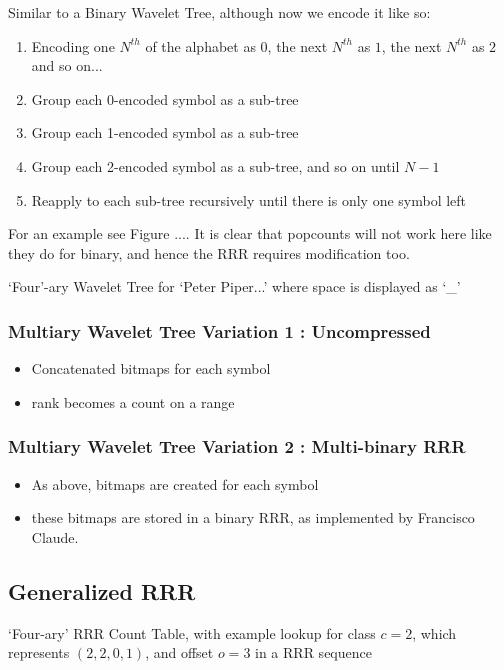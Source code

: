 Similar to a Binary Wavelet Tree, although now we encode it like so:

\begin{enumerate}
    \item Encoding one $N^{th}$ of the alphabet as $0$, the next $N^{th}$ as $1$,
    the next $N^{th}$ as $2$ and so on...
    \item Group each 0-encoded symbol as a sub-tree
    \item Group each 1-encoded symbol as a sub-tree
    \item Group each 2-encoded symbol as a sub-tree, and so on until $N-1$
    \item Reapply to each sub-tree recursively until there is only one symbol
    left
\end{enumerate}
For an example see Figure .... It is clear that popcounts will not work
here like they do for binary, and hence the RRR requires modification too.
		
			{`Four'-ary Wavelet Tree for `Peter Piper...' where space is 
			displayed as `\_'}
			

\subsubsection{Multiary Wavelet Tree Variation 1 : Uncompressed}
\begin{itemize}
\item
  Concatenated bitmaps for each symbol
\item
  rank becomes a count on a range
\end{itemize}

\subsubsection{Multiary Wavelet Tree Variation 2 : Multi-binary RRR}
\begin{itemize}
\item
  As above, bitmaps are created for each symbol
\item
  these bitmaps are stored in a binary RRR, as implemented by
  Francisco Claude.
\end{itemize}

\subsection{Generalized RRR}
	{`Four-ary' RRR Count Table, with example lookup for class $c = 2$, 
	which represents $(2, 2, 0, 1)$, and offset $o = 3$ in a RRR
	sequence}